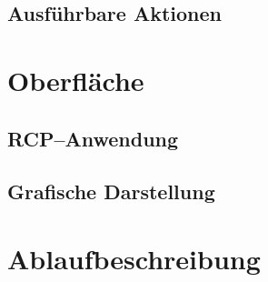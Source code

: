 \subsection{Ausf\"uhrbare Aktionen}

\section{Oberfl\"ache}
\subsection{RCP--Anwendung}
\subsection{Grafische Darstellung}

\section{Ablaufbeschreibung}
